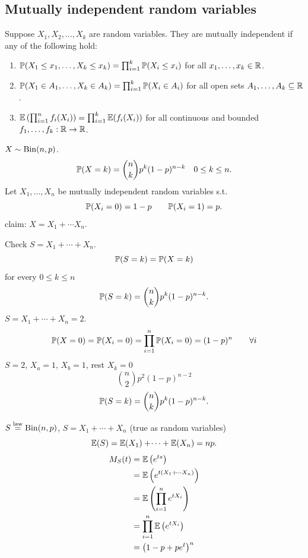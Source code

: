 \documentclass[10pt, a4paper]{article}
\begin{document}
\subsection{Mutually independent random variables}
Suppose $X_1, X_2, \dotsc, X_k$ are random variables.
They are mutually independent if any of the following hold:
\begin{enumerate}[label = (\roman*)]
    \item $\P(X_1 \leq x_1, \dotsc, X_k \leq x_k) = \prod_{i = 1}^{k}\P(X_i \leq x_i)$ for all $x_1, \dotsc, x_k \in \R$.

    \item $\P(X_1 \in A_1, \dotsc, X_k \in A_k) = \prod_{i = 1}^{k}\P(X_i \in A_i)$ for all open sets $A_1, \dotsc, A_k \subseteq \R$.

    \item $\E\left(\prod_{i = 1}^{n}f_i(X_i)\right) = \prod_{i = 1}^{k}\E(f_i(X_i))$ for all continuous and bounded $f_1, \dotsc, f_k : \R \to \R$.
\end{enumerate}

\begin{example}
    $X \sim \Bin(n, p)$.
    \[
    \P(X = k) = \binom{n}{k}p ^ k(1 - p) ^ {n - k}\quad 0 \leq k \leq n.
    \]
    Let $X_1, \dotsc, X_n$ be mutually independent random variables s.t.
    \[
    \P(X_i = 0) = 1 - p\qquad \P(X_i = 1) = p.
    \]
    claim:
    $X = X_1 + \dotsi X_n$.

    Check $S = X_1 + \dotsi + X_n$.
    \[
    \P(S = k) = \P(X = k)
    \]
    for every $0 \leq k \leq n$
    \[
    \P(S = k) = \binom{n}{k}p ^ k(1 - p) ^ {n - k}.
    \]
    $S = X_1 + \dotsi + X_n = 2$.
    \[
    \P(X = 0) = \P(X_i = 0) = \prod_{i = 1}^{n}\P(X_i = 0) = (1 - p) ^ n\qquad \forall i
    \]
    $S = 2$,
    $X_a = 1$,
    $X_b = 1$,
    rest $X_k = 0$
    \[
    \binom{n}{2}p ^ 2(1 - p) ^ {n - 2}
    \]
    \[
    \P(S = k) = \binom{n}{k}p ^ k(1 - p) ^ {n - k}.
    \]

    $S \overset{\text{law}}{=} \Bin(n, p)$,
    $S = X_1 + \dotsi + X_n$
    (true as random variables)
    \[
    \E(S) = \E(X_1) + \dotsi + \E(X_n) = np.
    \]
    \begin{align*}
        M_{S}(t) &= \E\left(e ^ {ts}\right) \\
        &= \E\left(e ^ {t(X_1 + \dotsi X_n)}\right) \\
        &= \E\left(\prod_{i = 1}^{n}e ^ {tX_i}\right) \\
        &= \prod_{i = 1}^{n}\E\left(e ^ {tX_i}\right) \\
        &= \left(1 - p + pe ^ t\right) ^ n
    \end{align*}
\end{example}
\end{document}
